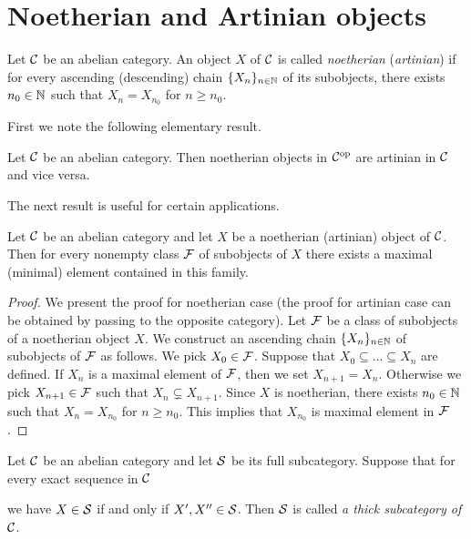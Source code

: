 \section{Noetherian and Artinian objects}

\begin{definition}
Let ${\mathcal C}$ be an abelian category. An object $X$ of ${\mathcal C}$ is called \textit{noetherian} (\textit{artinian}) if for every ascending (descending) chain $\{X_n\}_{n\in {\mathbb N}}$ of its subobjects, there exists $n_0\in {\mathbb N}$ such that $X_n = X_{n_0}$ for $n\geq n_0$.
\end{definition}
\noindent
First we note the following elementary result.

\begin{fact}\label{fact:noetherian_is_dual_to_artinian}
Let ${\mathcal C}$ be an abelian category. Then noetherian objects in ${\mathcal C}^{\mathrm{op}}$ are artinian in ${\mathcal C}$ and vice versa.
\end{fact}
\noindent
The next result is useful for certain applications.

\begin{proposition}\label{proposition:characterization_of_noetherian_objects}
Let ${\mathcal C}$ be an abelian category and let $X$ be a noetherian (artinian) object of ${\mathcal C}$. Then for every nonempty class ${\mathcal F}$ of subobjects of $X$ there exists a maximal (minimal) element contained in this family.
\end{proposition}
\begin{proof}
We present the proof for noetherian case (the proof for artinian case can be obtained by passing to the opposite category). Let ${\mathcal F}$ be a class of subobjects of a noetherian object $X$. We construct an ascending chain $\{X_n\}_{n\in {\mathbb N}}$ of subobjects of ${\mathcal F}$ as follows. We pick $X_0\in {\mathcal F}$. Suppose that $X_0\subseteq ...\subseteq X_n$ are defined. If $X_n$ is a maximal element of ${\mathcal F}$, then we set $X_{n+1} = X_n$. Otherwise we pick $X_{n+1}\in {\mathcal F}$ such that $X_n\subsetneq X_{n+1}$. Since $X$ is noetherian, there exists $n_0\in {\mathbb N}$ such that $X_n = X_{n_0}$ for $n\geq n_0$. This implies that $X_{n_0}$ is maximal element in ${\mathcal F}$.
\end{proof}

\begin{definition}
Let ${\mathcal C}$ be an abelian category and let ${\mathcal S}$ be its full subcategory. Suppose that for every exact sequence in ${\mathcal C}$
\begin{center}
\end{center}
we have $X\in {\mathcal S}$ if and only if $X',X''\in {\mathcal S}$. Then ${\mathcal S}$ is called \textit{a thick subcategory of ${\mathcal C}$}.
\end{definition}

